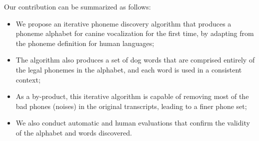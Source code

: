 Our contribution can be summarized as follows:
\begin{itemize}
\item We propose an iterative phoneme discovery algorithm that produces a phoneme alphabet
for canine vocalization for the first time, by adapting from the phoneme definition for human languages;
\item The algorithm also produces a set of dog words that are comprised 
entirely of the legal phonemes in the alphabet, and each word is used in a consistent 
context;
\item As a by-product, this iterative algorithm is capable of removing most of the bad 
phones (noises) in the original transcripts, leading to a finer phone set;
\item We also conduct automatic and human evaluations that confirm the validity of the alphabet and words discovered.
\end{itemize}


